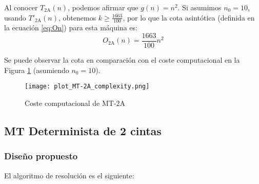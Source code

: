 Al conocer $T_{\mathrm{2A}}(n)$, podemos afirmar que $g(n) = n^2$. Si asumimos $n_0 = 10$, usando $T'_{\mathrm{2A}}(n)$, obtenemos $k \geq \frac{1663}{100}$, por lo que la cota asintótica (definida en la ecuación \ref{eq:On}) para esta máquina es:
\begin{equation}
    O_{\mathrm{2A}}(n) = \frac{1663}{100}n^2
\end{equation}

Se puede observar la cota en comparación con el coste computacional en la Figura \ref{fig:MT-2A_plot} (asumiendo $n_0 = 10$).


\begin{figure}[h]
    \centering
    \texttt{[image: plot\_MT-2A\_complexity.png]}
    \caption{Coste computacional de MT-2A}
    \label{fig:MT-2A_plot}
\end{figure}




\subsection{MT Determinista de 2 cintas}

\subsubsection*{Diseño propuesto}
El algoritmo de resolución es el siguiente:

